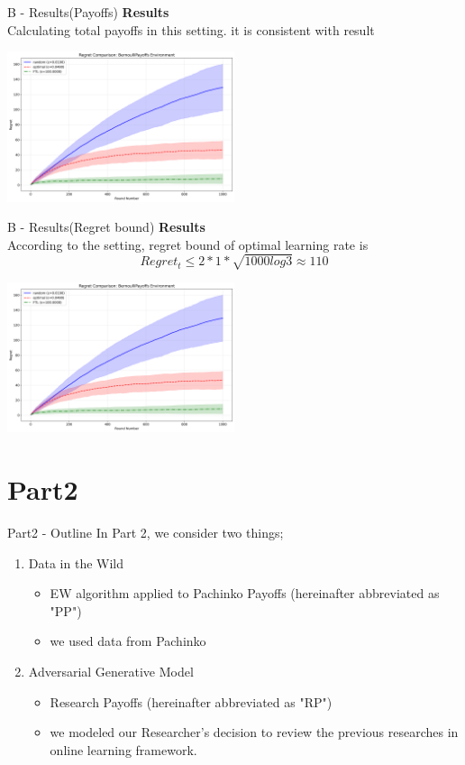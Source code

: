 \documentclass{beamer}
\begin{document}
\begin{frame}{B - Results(Payoffs)}
\textbf{Results}\\
Calculating total payoffs in this setting. it is consistent with result
\begin{center}
    \includegraphics[width=0.5\textwidth]{332Project2/figures/bernoulli_regret_comparison.png}
\end{center}
\end{frame}

\begin{frame}{B - Results(Regret bound)}
\textbf{Results}\\
    According to the setting, regret bound of optimal learning rate is
    \[
    Regret_t \leq 2 * 1 * \sqrt{1000log3} \approx 110
    \]
\begin{center}
    \includegraphics[width=0.5\textwidth]{332Project2/figures/bernoulli_regret_comparison.png}
\end{center}
\end{frame}


\section{Part2}


\begin{frame}{Part2 - Outline}
In Part 2, we consider two things;
\begin{enumerate}
    \item Data in the Wild
    \begin{itemize}
        \item EW algorithm applied to Pachinko Payoffs (hereinafter abbreviated as "PP")
        \item we used data from Pachinko
    \end{itemize}
    \item Adversarial Generative Model
    \begin{itemize}
        \item Research Payoffs (hereinafter abbreviated as "RP")
        \item we modeled our Researcher's decision to review the previous researches in online learning framework.
    \end{itemize}
\end{enumerate}
\end{frame}
\end{document}
